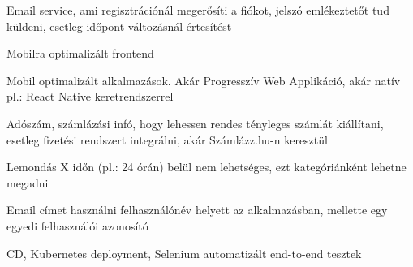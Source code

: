 \begin{compactitem}
    \item Email service, ami regisztrációnál megerősíti a fiókot, jelszó emlékeztetőt tud küldeni, esetleg időpont változásnál értesítést
    \item Mobilra optimalizált frontend
    \item Mobil optimalizált alkalmazások. Akár Progresszív Web Applikáció, akár natív pl.: React Native keretrendszerrel
    \item Adószám, számlázási infó, hogy lehessen rendes tényleges számlát kiállítani, esetleg fizetési rendszert integrálni, akár Számlázz.hu-n keresztül
    \item Lemondás X időn (pl.: 24 órán) belül nem lehetséges, ezt kategóriánként lehetne megadni
    \item Email címet használni felhasználónév helyett az alkalmazásban, mellette egy egyedi felhasználói azonosító
    \item CD, Kubernetes deployment, Selenium automatizált end-to-end tesztek
\end{compactitem}


